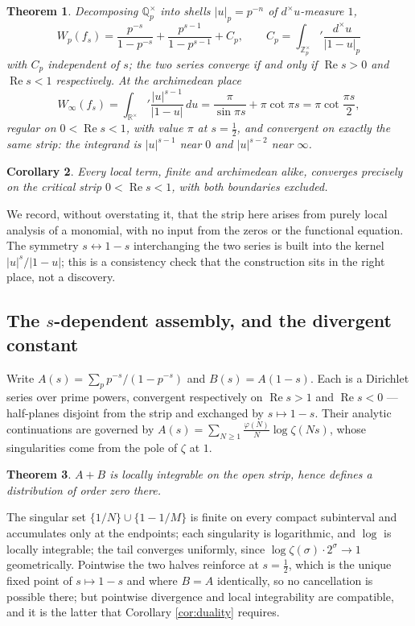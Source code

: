 \documentclass[11pt]{amsart}
\newtheorem{theorem}{Theorem}[section]
\newtheorem{corollary}[theorem]{Corollary}
\theoremstyle{definition}
\theoremstyle{remark}
\newcommand{\R}{\mathbb R}
\newcommand{\Z}{\mathbb Z}
\newcommand{\Q}{\mathbb Q}
\newcommand{\Rel}{\operatorname{Re}}
\begin{document}
\begin{theorem}\label{thm:localterms}
Decomposing $\Q_p^\times$ into shells $|u|_p=p^{-n}$ of $d^\times u$-measure
$1$,
\[
 W_p(f_s)=\frac{p^{-s}}{1-p^{-s}}+\frac{p^{s-1}}{1-p^{s-1}}+C_p,
 \qquad
 C_p=\int_{\Z_p^\times}'\frac{d^\times u}{|1-u|_p}
\]
with $C_p$ independent of $s$; the two series converge if and only if
$\Rel s>0$ and $\Rel s<1$ respectively.  At the archimedean place
\[
 W_\infty(f_s)=\int_{\R^\times}'\frac{|u|^{s-1}}{|1-u|}\,du
 =\frac{\pi}{\sin\pi s}+\pi\cot\pi s=\pi\cot\frac{\pi s}{2},
\]
regular on $0<\Rel s<1$, with value $\pi$ at $s=\tfrac12$, and convergent
on exactly the same strip: the integrand is $|u|^{s-1}$ near $0$ and
$|u|^{s-2}$ near $\infty$.
\end{theorem}

\begin{corollary}
Every local term, finite and archimedean alike, converges precisely on the
critical strip $0<\Rel s<1$, with both boundaries excluded.
\end{corollary}

We record, without overstating it, that the strip here arises from purely
local analysis of a monomial, with no input from the zeros or the functional
equation.  The symmetry $s\leftrightarrow 1-s$ interchanging the two series
is built into the kernel $|u|^{s}/|1-u|$; this is a consistency check that
the construction sits in the right place, not a discovery.

\subsection{The $s$-dependent assembly, and the divergent constant}

Write $A(s)=\sum_p p^{-s}/(1-p^{-s})$ and $B(s)=A(1-s)$.  Each is a Dirichlet
series over prime powers, convergent respectively on $\Rel s>1$ and
$\Rel s<0$ --- half-planes disjoint from the strip and exchanged by
$s\mapsto 1-s$.  Their analytic continuations are governed by
$A(s)=\sum_{N\ge1}\frac{\varphi(N)}{N}\log\zeta(Ns)$, whose singularities come
from the pole of $\zeta$ at $1$.

\begin{theorem}\label{thm:locint}
$A+B$ is locally integrable on the open strip, hence defines a distribution
of order zero there.
\end{theorem}

The singular set $\{1/N\}\cup\{1-1/M\}$ is finite on every compact
subinterval and accumulates only at the endpoints; each singularity is
logarithmic, and $\log$ is locally integrable; the tail converges uniformly,
since $\log\zeta(\sigma)\cdot2^{\sigma}\to1$ geometrically.  Pointwise the two
halves reinforce at $s=\tfrac12$, which is the unique fixed point of
$s\mapsto1-s$ and where $B=A$ identically, so no cancellation is possible
there; but pointwise divergence and local integrability are compatible, and
it is the latter that Corollary \ref{cor:duality} requires.
\end{document}
